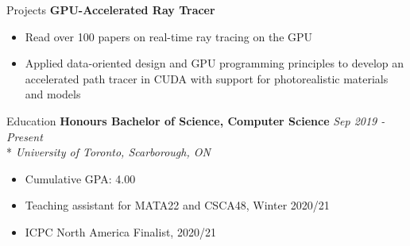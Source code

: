 \documentclass[11pt, letterpaper]{article}
\begin{document}
\begin{section}{Projects}
\textbf{GPU-Accelerated Ray Tracer}
\begin{itemize}
  \item Read over 100 papers on real-time ray tracing on the GPU
  \item Applied data-oriented design and GPU programming principles to develop an accelerated path tracer in CUDA with support for photorealistic materials and models
\end{itemize}

\end{section}

\begin{section}{Education}
\textbf{Honours Bachelor of Science, Computer Science}
\hfill
\textit{Sep 2019 - Present}\\*
\textit{University of Toronto, Scarborough, ON}
\begin{itemize}
  \item Cumulative GPA: 4.00
  \item Teaching assistant for MATA22 and CSCA48, Winter 2020/21
  \item ICPC North America Finalist, 2020/21
\end{itemize}

\end{section}
\end{document}
